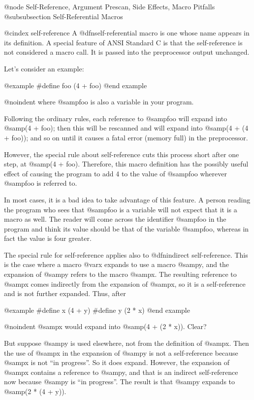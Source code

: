 {{@node Self-Reference, Argument Prescan, Side Effects, Macro Pitfalls
@subsubsection Self-Referential Macros

@cindex self-reference
A @dfn{self-referential} macro is one whose name appears in its definition.
A special feature of ANSI Standard C is that the self-reference is not
considered a macro call.  It is passed into the preprocessor output
unchanged.

Let's consider an example:

@example
#define foo (4 + foo)
@end example

@noindent
where @samp{foo} is also a variable in your program.

Following the ordinary rules, each reference to @samp{foo} will expand into
@samp{(4 + foo)}; then this will be rescanned and will expand into @samp{(4
+ (4 + foo))}; and so on until it causes a fatal error (memory full) in the
preprocessor.

However, the special rule about self-reference cuts this process short
after one step, at @samp{(4 + foo)}.  Therefore, this macro definition
has the possibly useful effect of causing the program to add 4 to
the value of @samp{foo} wherever @samp{foo} is referred to.

In most cases, it is a bad idea to take advantage of this feature.  A
person reading the program who sees that @samp{foo} is a variable will
not expect that it is a macro as well.  The reader will come across the
identifier @samp{foo} in the program and think its value should be that
of the variable @samp{foo}, whereas in fact the value is four greater.

The special rule for self-reference applies also to @dfn{indirect}
self-reference.  This is the case where a macro @var{x} expands to use a
macro @samp{y}, and the expansion of @samp{y} refers to the macro
@samp{x}.  The resulting reference to @samp{x} comes indirectly from the
expansion of @samp{x}, so it is a self-reference and is not further
expanded.  Thus, after

@example
#define x (4 + y)
#define y (2 * x)
@end example

@noindent
@samp{x} would expand into @samp{(4 + (2 * x))}.  Clear?

But suppose @samp{y} is used elsewhere, not from the definition of @samp{x}.
Then the use of @samp{x} in the expansion of @samp{y} is not a self-reference
because @samp{x} is not ``in progress''.  So it does expand.  However,
the expansion of @samp{x} contains a reference to @samp{y}, and that
is an indirect self-reference now because @samp{y} is ``in progress''.
The result is that @samp{y} expands to @samp{(2 * (4 + y))}.

}}
